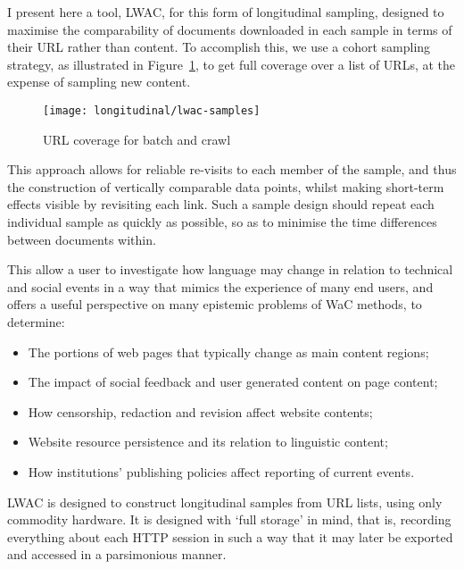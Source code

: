 I present here a tool, LWAC, for this form of longitudinal sampling, designed to maximise the comparability of documents downloaded in each sample in terms of their URL rather than content.  To accomplish this, we use a cohort sampling strategy, as illustrated in Figure~\ref{fig:longitudinal:lwac:samples}, to get full coverage over a list of URLs, at the expense of sampling new content.

\begin{figure}[Ht]
    \centering
    \texttt{[image: longitudinal/lwac-samples]}
    \caption{URL coverage for batch and crawl}
    \label{fig:longitudinal:lwac:samples}
\end{figure}

This approach allows for reliable re-visits to each member of the sample, and thus the construction of vertically comparable data points, whilst making short-term effects visible by revisiting each link.  Such a sample design should repeat each individual sample as quickly as possible, so as to minimise the time differences between documents within.


This allow a user to investigate how language may change in relation to technical and social events in a way that mimics the experience of many end users, and offers a useful perspective on many epistemic problems of WaC methods, to determine:


\begin{itemize}
    \item The portions of web pages that typically change as main content regions;
        \vspace{-6pt}
    \item The impact of social feedback and user generated content on page content;
        \vspace{-6pt}
    \item How censorship, redaction and revision affect website contents;
        \vspace{-6pt}
    \item Website resource persistence and its relation to linguistic content;
        \vspace{-6pt}
    \item How institutions' publishing policies affect reporting of current events.
\end{itemize}

LWAC is designed to construct longitudinal samples from URL lists, using only commodity hardware.  It is designed with `full storage' in mind, that is, recording everything about each HTTP session in such a way that it may later be exported and accessed in a parsimonious manner.


